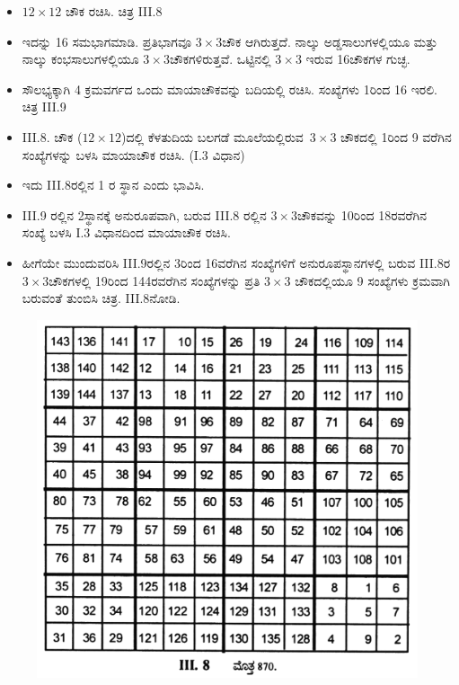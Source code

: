 \begin{itemize}
	\item $12 \times 12$ ಚೌಕ ರಚಿಸಿ. ಚಿತ್ರ  III.8 \smallskip
	\item ಇದನ್ನು 16 ಸಮಭಾಗಮಾಡಿ. ಪ್ರತಿಭಾಗವೂ $3 \times 3$ಚೌಕ ಆಗಿರುತ್ತದೆ. ನಾಲ್ಕು ಅಡ್ಡಸಾಲುಗಳಲ್ಲಿಯೂ ಮತ್ತು ನಾಲ್ಕು ಕಂಭಸಾಲುಗಳಲ್ಲಿಯೂ $3 \times 3$ಚೌಕಗಳಿರುತ್ತವೆ. ಒಟ್ಟಿನಲ್ಲಿ $3 \times 3$ ಇರುವ 16ಚೌಕಗಳ ಗುಚ್ಛ.\smallskip
	\item ಸೌಲಭ್ಯಕ್ಕಾಗಿ 4 ಕ್ರಮವರ್ಗದ ಒಂದು ಮಾಯಾಚೌಕವನ್ನು ಬದಿಯಲ್ಲಿ ರಚಿಸಿ. ಸಂಖ್ಯೆ\-ಗಳು 1ರಿಂದ 16 ಇರಲಿ. ಚಿತ್ರ  III.9\smallskip
	\item III.8. ಚೌಕ ($12 \times 12$)ದಲ್ಲಿ ಕೆಳತುದಿಯ ಬಲಗಡೆ \hbox{ಮೂಲೆಯಲ್ಲಿರುವ $3 \times 3$} ಚೌಕದಲ್ಲಿ 1ರಿಂದ 9 ವರೆಗಿನ ಸಂಖ್ಯೆಗಳನ್ನು ಬಳಸಿ ಮಾಯಾಚೌಕ ರಚಿಸಿ. \linebreak (I.3 ವಿಧಾನ)\smallskip
	\item ಇದು  III.8ರಲ್ಲಿನ 1 ರ ಸ್ಥಾನ ಎಂದು ಭಾವಿಸಿ.\smallskip
	\item  III.9 ರಲ್ಲಿನ 2ಸ್ಥಾನಕ್ಕೆ ಅನುರೂಪವಾಗಿ, ಬರುವ  III.8 ರಲ್ಲಿನ $3 \times 3$ಚೌಕವನ್ನು 10ರಿಂದ 18ರವರೆಗಿನ ಸಂಖ್ಯೆ ಬಳಸಿ I.3 ವಿಧಾನದಿಂದ ಮಾಯಾಚೌಕ ರಚಿಸಿ.\smallskip
	\item ಹೀಗೆಯೇ ಮುಂದುವರಿಸಿ  III.9ರಲ್ಲಿನ 3ರಿಂದ 16ವರೆಗಿನ ಸಂಖ್ಯೆಗಳಿಗೆ ಅನುರೂಪಸ್ಥಾನಗಳಲ್ಲಿ ಬರುವ  III.8ರ $3 \times 3$ಚೌಕಗಳಲ್ಲಿ 19ರಿಂದ 144ರವರೆಗಿನ ಸಂಖ್ಯೆಗಳನ್ನು ಪ್ರತಿ $3 \times 3$ ಚೌಕದಲ್ಲಿಯೂ 9 ಸಂಖ್ಯೆಗಳು ಕ್ರಮವಾಗಿ ಬರುವಂತೆ ತುಂಬಿಸಿ ಚಿತ್ರ. III.8ನೋಡಿ.\smallskip
\end{itemize}

	\begin{figure}[H]
	\includegraphics[scale=1.2]{src/figures/chap3/fig3-35.jpg}
	\end{figure}

